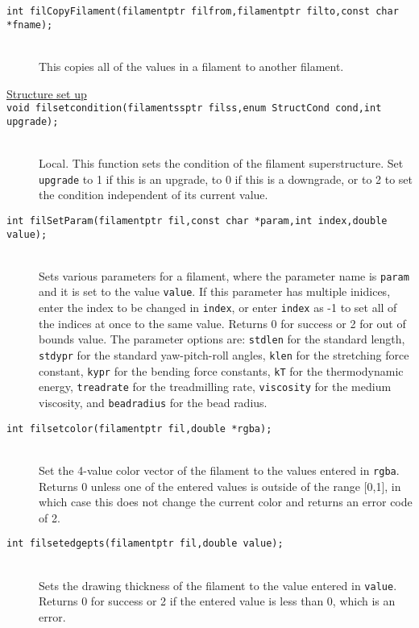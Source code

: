 \documentclass {book}
\begin{document}
\begin{description}
\item[\texttt{int filCopyFilament(filamentptr filfrom,filamentptr filto,const char *fname);}]
\hfill \\
This copies all of the values in a filament to another filament.

\item[\underline{Structure set up}]

\item[\texttt{void filsetcondition(filamentssptr filss,enum StructCond cond,int upgrade);}]
\hfill \\
Local. This function sets the condition of the filament superstructure. Set \texttt{upgrade} to 1 if this is an upgrade, to 0 if this is a downgrade, or to 2 to set the condition independent of its current value.

\item[\texttt{int filSetParam(filamentptr fil,const char *param,int index,double value);}]
\hfill \\
Sets various parameters for a filament, where the parameter name is \texttt{param} and it is set to the value \texttt{value}. If this parameter has multiple inidices, enter the index to be changed in \texttt{index}, or enter \texttt{index} as -1 to set all of the indices at once to the same value. Returns 0 for success or 2 for out of bounds value. The parameter options are: \texttt{stdlen} for the standard length, \texttt{stdypr} for the standard yaw-pitch-roll angles, \texttt{klen} for the stretching force constant, \texttt{kypr} for the bending force constants, \texttt{kT} for the thermodynamic energy, \texttt{treadrate} for the treadmilling rate, \texttt{viscosity} for the medium viscosity, and \texttt{beadradius} for the bead radius.

\item[\texttt{int filsetcolor(filamentptr fil,double *rgba);}]
\hfill \\
Set the 4-value color vector of the filament to the values entered in \texttt{rgba}. Returns 0 unless one of the entered values is outside of the range [0,1], in which case this does not change the current color and returns an error code of 2.

\item[\texttt{int filsetedgepts(filamentptr fil,double value);}]
\hfill \\
Sets the drawing thickness of the filament to the value entered in \texttt{value}. Returns 0 for success or 2 if the entered value is less than 0, which is an error.


\end{description}
\end{document}
